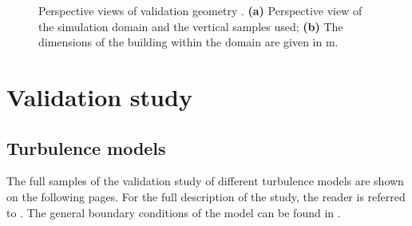 \begin{figure}[!h]
	\captionsetup{format=plain}	
	\caption[Geometry used for the validation study; perspective views]{Perspective views of validation geometry  \citep{Jiang2003}. \textbf{(a)} Perspective view of the simulation domain and the vertical samples used; \textbf{(b)} The dimensions of the building within the domain are given in \si{\metre}.}
	\label{fig:validationscaleddownbuilding}
\end{figure}




\clearpage
\chapter{Validation study}
\section{Turbulence models}
\label{sec:appendix_turbulence_study}


The full samples of the validation study of different turbulence models are shown on the following pages.
For the full description of the study, the reader is referred to . The general boundary conditions of the model can be found in .





\cleartoleftpage
\enlargethispage{3cm}


\clearpage



\clearpage

